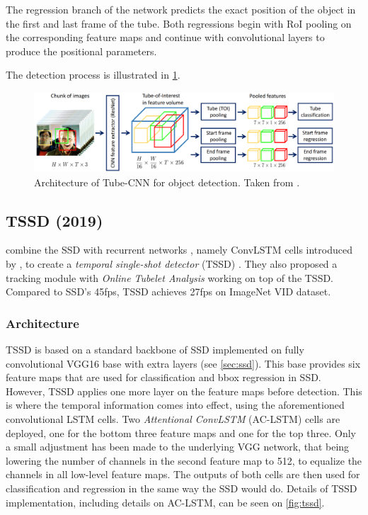 The regression branch of the network predicts the exact position of the object in the first and last frame of the tube. Both regressions begin with RoI pooling on the corresponding feature maps and continue with convolutional layers to produce the positional parameters. 

The detection process is illustrated in \cref{fig:tubecnn}.


\begin{figure}
    \centering
    \includegraphics[width=\textwidth]{img/tubecnn}
    \caption[Tube-CNN architecture]%
    {Architecture of Tube-CNN for object detection. Taken from \cite[fig.~2]{bib:tubeCNN}.}
    \label{fig:tubecnn}
\end{figure}


\subsection{TSSD (2019)}
\label{tssd}
\citeauthor{bib:tssd} combine the SSD with recurrent networks \cite[chpt.~10]{bib:dlbook}, namely ConvLSTM cells introduced by \citeauthor{bib:convlstm} \cite{bib:convlstm}, to create a \textit{temporal single-shot detector} (TSSD) \cite{bib:tssd}. They also proposed a tracking module with \textit{Online Tubelet Analysis} working on top of the TSSD.
Compared to SSD's 45fps, TSSD achieves 27fps on ImageNet VID dataset.  

\subsubsection{Architecture}
TSSD is based on a standard backbone of SSD implemented on fully convolutional VGG16 base with extra layers (see \cref{sec:ssd}). This base provides six feature maps that are used for classification and bbox regression in SSD. However, TSSD applies one more layer on the feature maps before detection. This is where the temporal information comes into effect, using the aforementioned convolutional LSTM cells. Two \textit{Attentional ConvLSTM} (AC-LSTM) cells are deployed, one for the bottom three feature maps and one for the top three. Only a small adjustment has been made to the underlying VGG network, that being lowering the number of channels in the second feature map to 512, to equalize the channels in all low-level feature maps. The outputs of both cells are then used for classification and regression in the same way the SSD would do. Details of TSSD implementation, including details on AC-LSTM, can be seen on \cref{fig:tssd}. 

